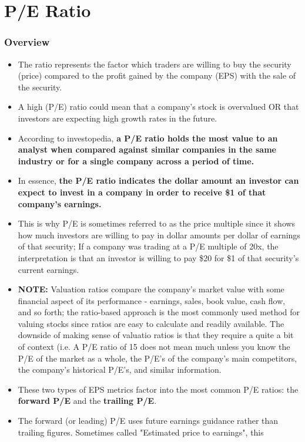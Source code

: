 \documentclass{article}
\begin{document}
	\section{P/E Ratio}
	\label{sec:PER}

		\subsubsection{Overview}
		\begin{itemize}
		\item The ratio represents the factor which traders are willing to buy the security (price) compared to the profit gained by the company (EPS) with the sale of the security.
			\item A high (P/E) ratio could mean that a company's stock is overvalued OR that investors are expecting high growth rates in the future.
			\item According to investopedia, {\bf a P/E ratio holds the most value to an analyst when compared against similar companies in the same industry or for a single company across a period of time.}
			\item In essence, {\bf the P/E ratio indicates the dollar amount an investor can expect to invest in a company in order to receive \$1 of that company's earnings.}
			\item This is why P/E is sometimes referred to as the price multiple since it shows how much investors are willing to pay in dollar amounts per dollar of earnings of that security; If a company was trading at a P/E multiple of 20x, the interpretation is that an investor is willing to pay \$20 for \$1 of that security's current earnings.
			\item {\bf NOTE:} Valuation ratios compare the company's market value with some financial aspect of its performance - earnings, sales, book value, cash flow, and so forth; the ratio-based approach is the most commonly used method for valuing stocks since ratios are easy to calculate and readily available. The downside of making sense of valuatio ratios is that they require a quite a bit of context (i.e. A P/E ratio of 15 does not mean much unless you know the P/E of the market as a whole, the P/E's of the company's main competitors, the company's historical P/E's, and similar information.
			\item These two types of EPS metrics factor into the most common P/E ratios: the {\bf forward P/E} and the {\bf trailing P/E}.
			\item The forward (or leading) P/E uses future earnings guidance rather than trailing figures. Sometimes called "Estimated price to earnings", this

\end{itemize}
\end{document}
